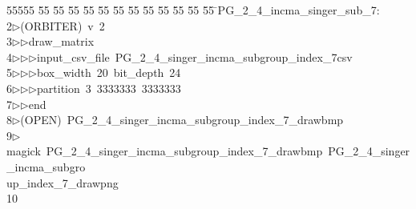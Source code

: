 %
%
\begin{tabbing}
55555 \= 55 \= 55 \= 55 \= 55 \= 55 \= 55 \= 55 \= 55 \= 55 \= 55 \= 55 \= 55 \= \>PG\_2\_4\_incma\_singer\_sub\_7:\\[0pt]
2\>$\triangleright$\>(ORBITER)\ v\ 2\ \\[0pt]
3\>$\triangleright$\>$\triangleright$\>draw\_matrix\ \\[0pt]
4\>$\triangleright$\>$\triangleright$\>$\triangleright$\>input\_csv\_file\ PG\_2\_4\_singer\_incma\_subgroup\_index\_7csv\ \\[0pt]
5\>$\triangleright$\>$\triangleright$\>$\triangleright$\>box\_width\ 20\ bit\_depth\ 24\ \\[0pt]
6\>$\triangleright$\>$\triangleright$\>$\triangleright$\>partition\ 3\ 3333333\ 3333333\ \\[0pt]
7\>$\triangleright$\>$\triangleright$\>end\\[0pt]
8\>$\triangleright$\>(OPEN)\ PG\_2\_4\_singer\_incma\_subgroup\_index\_7\_drawbmp\\[0pt]
9\>$\triangleright$\>magick\ PG\_2\_4\_singer\_incma\_subgroup\_index\_7\_drawbmp\ PG\_2\_4\_singer\_incma\_subgro\\[0pt]
\>up\_index\_7\_drawpng\\[0pt]
10\>\end{tabbing}
